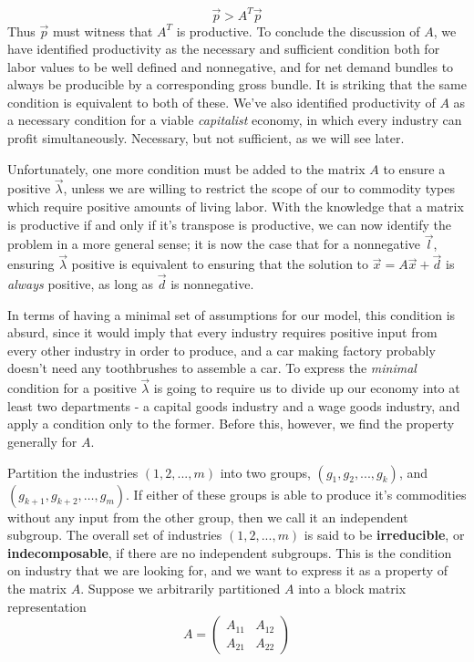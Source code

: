\[ \vec{p} > A^T\vec{p} \]
Thus $\vec{p}$ must witness that $A^T$ is productive. To conclude the discussion of $A$, we have identified productivity as the necessary and sufficient condition both for labor values to be well defined and nonnegative, and for net demand bundles to always be producible by a corresponding gross bundle. It is striking that the same condition is equivalent to both of these. We've also identified productivity of $A$ as a necessary condition for a viable \textit{capitalist} economy, in which every industry can profit simultaneously. Necessary, but not sufficient, as we will see later. \par 
Unfortunately, one more condition must be added to the matrix $A$ to ensure a positive $\vec{\lambda}$, unless we are willing to restrict the scope of our to commodity types which require positive amounts of living labor. With the knowledge that a matrix is productive if and only if it's transpose is productive, we can now identify the problem in a more general sense; it is now the case that for a nonnegative $\vec{l}$, ensuring $\vec{\lambda}$ positive is equivalent to ensuring that the solution to $\vec{x} = A\vec{x} + \vec{d}$ is \textit{always} positive, as long as $\vec{d}$ is nonnegative. \par
In terms of having a minimal set of assumptions for our model, this condition is absurd, since it would imply that every industry requires positive input from every other industry in order to produce, and a car making factory probably doesn't need any toothbrushes to assemble a car. To express the \emph{minimal} condition for a positive $\vec{\lambda}$ is going to require us to divide up our economy into at least two departments - a capital goods industry and a wage goods industry, and apply a condition only to the former. Before this, however, we find the property generally for $A$. \par 
Partition the industries $(1,2,...,m)$ into two groups, $(g_1,g_2,...,g_k)$, and $(g_{k+1},g_{k+2},\ldots,g_m)$. If either of these groups is able to produce it's commodities without any input from the other group, then we call it an independent subgroup. The overall set of industries $(1,2,...,m)$ is said to be \textbf{irreducible}, or \textbf{indecomposable}, if there are no independent subgroups. This is the condition on industry that we are looking for, and we want to express it as a property of the matrix $A$. Suppose we arbitrarily partitioned $A$ into a block matrix representation
\[ A = \begin{pmatrix} A_{11} & A_{12} \\ A_{21} & A_{22} \end{pmatrix} \]
